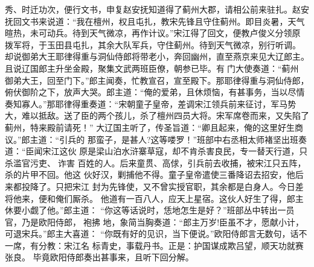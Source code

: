 秀、时迁功次，便行文书，申复赵安抚知道得了蓟州大郡，请相公前来驻扎。赵安
抚回文书来说道：“我在檀州，权且屯扎，教宋先锋且守住蓟州。即目炎暑，天气
暄热，未可动兵。待到天气微凉，再作计议。”宋江得了回文，便教卢俊义分领原
拨军将，于玉田县屯扎，其余大队军兵，守住蓟州。待到天气微凉，别行听调。
却说御弟大王耶律得重与洞仙侍郎将带老小，奔回幽州，直至燕京来见大辽郎主。
且说辽国郎主升坐金殿，聚集文武两班臣僚，朝参已毕。有门大使奏道：“蓟州
御弟大王，回至门下。”郎主闻奏，忙教宣召，宣至殿下。那耶律得重与洞仙侍郎，
俯伏御阶之下，放声大哭。郎主道：“俺的爱弟，且休烦恼，有甚事务，当以尽情
奏知寡人。”那耶律得重奏道：“宋朝童子皇帝，差调宋江领兵前来征讨，军马势
大，难以抵敌。送了臣的两个孩儿，杀了檀州四员大将。宋军席卷而来，又失陷了
蓟州，特来殿前请死！”
大辽国主听了，传圣旨道：“卿且起来，俺的这里好生商议。”郎主道：“引兵的
那蛮子，是甚人?这等喽罗！”班部中右丞相太师褚坚出班奏道：“臣闻宋江这伙
原是梁山泊水浒寨草寇，却不肯杀害良民，专一替天行道，只杀滥官污吏、诈害
百姓的人。后来童贯、高俅，引兵前去收捕，被宋江只五阵，杀的片甲不回。他这
伙好汉，剿捕他不得。童子皇帝遣使三番降诏去招安，他后来都投降了。只把宋江
封为先锋使，又不曾实授官职，其余都是白身人。今日差将他来，便和俺们厮杀。
他道有一百八人，应天上星宿。这伙人好生了得，郎主休要小觑了他。”郎主道：
“你这等话说时，恁地怎生是好？”班部丛中转出一员官，乃是欧阳侍郎，袍拂
地，象简当胸奏道：“郎主万岁!臣虽不才，愿献小计，可退宋兵。”郎主大喜道：
“你既有好的见识，当下便说。”欧阳侍郎言无数句，话不一席，有分教：宋江名
标青史，事载丹书。正是：护国谋成欺吕望，顺天功就赛张良。
毕竟欧阳侍郎奏出甚事来，且听下回分解。